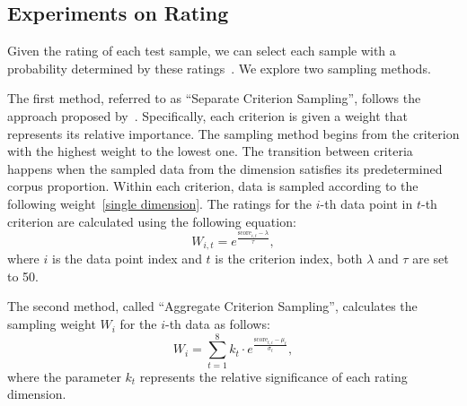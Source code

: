 \documentclass[11pt]{article}
\begin{document}
\subsection{Experiments on Rating}

Given the rating of each test sample, we can select each sample with a probability determined by these ratings~\citep {wettig2024qurating}.
We explore two sampling methods.

The first method, referred to as ``Separate Criterion Sampling'', follows the approach proposed by~\citep{wettig2024qurating}. Specifically, each criterion is given a weight that represents its relative importance. The sampling method begins from the criterion with the highest weight to the lowest one. The transition between criteria happens when the sampled data from the dimension satisfies its predetermined corpus proportion. Within each criterion, data is sampled according to the following weight~\ref{single dimension}. 
The ratings for the $i$-th data point in $t$-th criterion are calculated using the following equation: 
\begin{equation}
\label{single dimension}
W_{i,t} = e^{\frac{\text{score}_{i,t} - \lambda}{\tau}},
\end{equation}
where $i$ is the data point index and $t$ is the criterion index,  both $\lambda$ and $\tau$ are set to 50.


The second method, called ``Aggregate Criterion Sampling'', calculates the sampling weight $W_i$ for the $i$-th data as follows:
\begin{equation}
  W_i = \sum_{t=1}^{8} k_t \cdot e^{\frac{\text{score}_{t,i} - \mu_t}{\sigma_t}},
\end{equation}
where the parameter $k_t$ represents the relative significance of each rating dimension.
\end{document}
